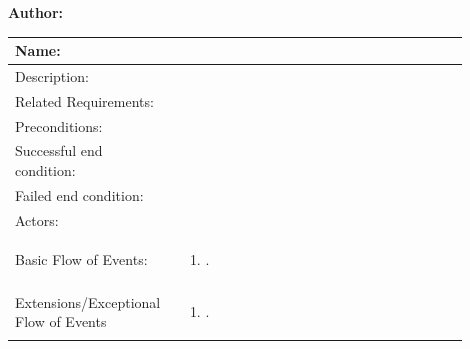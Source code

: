 \documentclass[11pt]{article}
\begin{document}
\begin{table}[!ht]
\begin{center}
\textbf{Author: }
\vspace*{1em}

\begin{tabular}{p{0.30\linewidth}p{0.60\linewidth}}
	Name: & \\\hline
	Description: & \\\hline
	Related Requirements:& \\\hline
	Preconditions:& \\\hline
	Successful end condition:& \\\hline
	Failed end condition:& \\\hline
	Actors:& \\\hline
	Basic Flow of Events: & \begin{enumerate}
	\item .
	\end{enumerate}\\\hline
	Extensions/Exceptional Flow of Events & \begin{enumerate}
	\item .
	\end{enumerate}
\end{tabular}
\label{des:con_web}	
\end{center}
\end{table}
\end{document}
